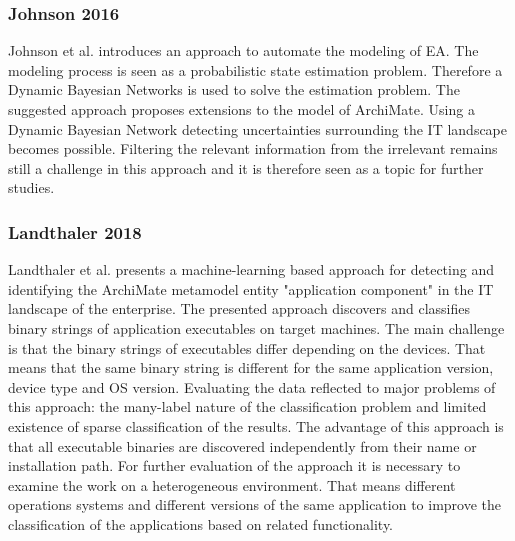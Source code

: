 \subsubsection{Johnson 2016}
Johnson et al. \cite{Johnson2016} introduces an approach to automate the modeling of EA. The modeling process is seen as a probabilistic state estimation problem. Therefore a Dynamic Bayesian Networks is used to solve the estimation problem. The suggested approach proposes extensions to the model of ArchiMate. Using a Dynamic Bayesian Network detecting uncertainties surrounding the IT landscape becomes possible. Filtering the relevant information from the irrelevant remains still a challenge in this approach and it is therefore seen as a topic for further studies.

\subsubsection{Landthaler 2018}
Landthaler et al. \cite{Landthaler2018} presents a machine-learning based approach for detecting and identifying the ArchiMate metamodel entity "application component" in the IT landscape of the enterprise. The presented approach discovers and classifies binary strings of application executables on target machines. The main challenge is that the binary strings of executables differ depending on the devices. That means that the same binary string is different for the same application version, device type and OS version. Evaluating the data reflected to major problems of this approach: the many-label nature of the classification problem and limited existence of sparse classification of the results.
The advantage of this approach is that all executable binaries are discovered independently from their name or installation path. 
For further evaluation of the approach it is necessary to examine the work on a heterogeneous environment. That means different operations systems and different versions of the same application to improve the classification of the applications based on related functionality.\cite{Landthaler2018}

